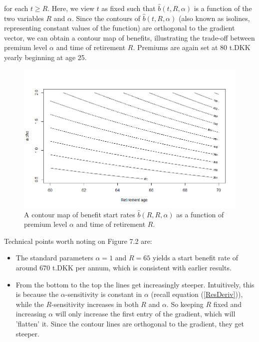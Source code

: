\documentclass{article}
\newcommand{\1}[1]{\mathbbm{1}_{\left\lbrace #1 \right\rbrace}}
\theoremstyle{break}
\theoremstyle{remark}
\numberwithin{equation}{section}
\begin{document}
for each $t \geq R$. Here, we view $t$ as fixed such that $\hat{b}(t,R,\alpha)$ is a function of the two variables $R$ and $\alpha$. Since the contours of $\hat{b}(t,R,\alpha)$ (also known as isolines, representing constant values of the function) are orthogonal to the gradient vector, we can obtain a contour map of benefits, illustrating the trade-off between premium level $\alpha$ and time of retirement $R$. Premiums are again set at 80 t.DKK yearly beginning at age 25.

\begin{figure}[H] \label{ContourGraph}
	\centering
	\caption{A contour map of benefit start rates $\hat{b}(R,R,\alpha)$ as a function of premium level $\alpha$ and time of retirement $R$.}
	\includegraphics[width=\textwidth]{Contour}		
\end{figure}

Technical points worth noting on Figure 7.2 are:

\begin{itemize}
	\item The standard parameters $\alpha=1$ and $R=65$ yields a start benefit rate of around 670 t.DKK per annum, which is consistent with earlier results.
	\item From the bottom to the top the lines get increasingly steeper. Intuitively, this is because the $\alpha$-sensitivity is constant in $\alpha$ (recall equation (\ref{ResDeriv})), while the $R$-sensitivity increases in both $R$ and $\alpha$. So keeping $R$ fixed and increasing $\alpha$ will only increase the first entry of the gradient, which will 'flatten' it. Since the contour lines are orthogonal to the gradient, they get steeper.
\end{itemize}
\end{document}

